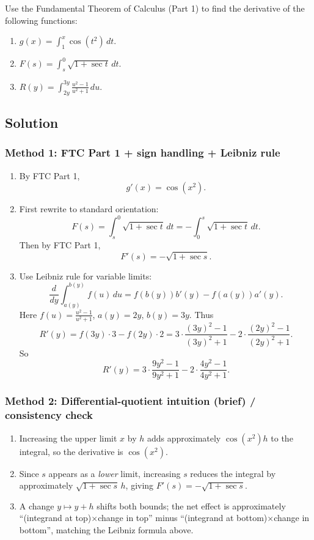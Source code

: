 \documentclass[12pt]{article}
\begin{document}
Use the Fundamental Theorem of Calculus (Part 1) to find the derivative of the following functions:
\begin{enumerate}[label=(\roman*)]
\item \(\displaystyle g(x)=\int_{1}^{x}\cos(t^2)\,dt.\)
\item \(\displaystyle F(s)=\int_{s}^{0}\sqrt{1+\sec t}\,dt.\)
\item \(\displaystyle R(y)=\int_{2y}^{3y}\frac{u^2-1}{u^2+1}\,du.\)
\end{enumerate}

\subsection*{Solution}

\subsubsection*{Method 1: FTC Part 1 + sign handling + Leibniz rule}

\begin{enumerate}[label=(\roman*)]
\item By FTC Part 1,
\[
g'(x)=\cos(x^2).
\]

\item First rewrite to standard orientation:
\[
F(s)=\int_{s}^{0}\sqrt{1+\sec t}\,dt = -\int_{0}^{s}\sqrt{1+\sec t}\,dt.
\]
Then by FTC Part 1,
\[
F'(s)=-\sqrt{1+\sec s}.
\]

\item Use Leibniz rule for variable limits:
\[
\frac{d}{dy}\int_{a(y)}^{b(y)} f(u)\,du = f(b(y))b'(y)-f(a(y))a'(y).
\]
Here \(f(u)=\frac{u^2-1}{u^2+1}\), \(a(y)=2y\), \(b(y)=3y\). Thus
\[
R'(y)=f(3y)\cdot 3 - f(2y)\cdot 2
=3\cdot\frac{(3y)^2-1}{(3y)^2+1}-2\cdot\frac{(2y)^2-1}{(2y)^2+1}.
\]
So
\[
R'(y)=3\cdot\frac{9y^2-1}{9y^2+1}-2\cdot\frac{4y^2-1}{4y^2+1}.
\]
\end{enumerate}

\subsubsection*{Method 2: Differential-quotient intuition (brief) / consistency check}

\begin{enumerate}[label=(\roman*)]
\item Increasing the upper limit \(x\) by \(h\) adds approximately \(\cos(x^2)h\) to the integral, so the derivative is \(\cos(x^2)\).

\item Since \(s\) appears as a \emph{lower} limit, increasing \(s\) reduces the integral by approximately \(\sqrt{1+\sec s}\,h\), giving \(F'(s)=-\sqrt{1+\sec s}\).

\item A change \(y\mapsto y+h\) shifts both bounds; the net effect is approximately ``(integrand at top)\(\times\)change in top'' minus ``(integrand at bottom)\(\times\)change in bottom'', matching the Leibniz formula above.
\end{enumerate}
\end{document}
